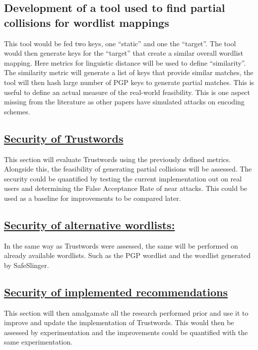 \subsection*{Development of a tool used to find partial collisions for wordlist mappings}
This tool would be fed two keys, one ``static'' and one the ``target''. The tool would then generate keys for the ``target'' that create a similar overall wordlist mapping. Here metrics for linguistic distance will be used to define ``similarity''.
The similarity metric will generate a list of keys that provide similar matches, the tool will then hash large number of PGP keys to generate partial matches. This is useful to define an actual measure of the real-world feasibility. This is one aspect missing from the literature as other papers have simulated attacks on encoding schemes.


\subsection*{\hyperref[ref:trustwords]{Security of Trustwords}}
This section will evaluate Trustwords using the previously defined metrics. Alongside this, the feasibility of generating partial collisions will be assessed. The security could be quantified by testing the current implementation out on real users and determining the False Acceptance Rate of near attacks. This could be used as a baseline for improvements to be compared later.

\subsection*{\hyperref[ref:alternatives]{Security of alternative wordlists:}}
In the same way as Trustwords were assessed, the same will be performed on already available wordlists. Such as the PGP wordlist and the wordlist generated by SafeSlinger.

\subsection*{\hyperref[ref:rec]{Security of implemented recommendations}}
This section will then amalgamate all the research performed prior and use it to improve and update the implementation of Trustwords. This would then be assessed by experimentation and the improvements could be quantified with the same experimentation.


